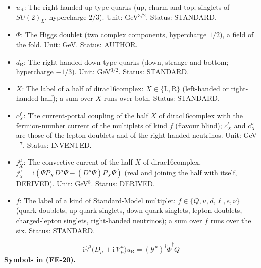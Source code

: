 \documentclass[
  10pt,
]{article}
\begin{document}
\begin{itemize}
  \(\tilde\Phi = \mathrm{i}\tau^2\Phi^*\) (hypercharge \(-1/2\)). Unit:
  GeV. Status: STANDARD.
\item
  \(u_{\mathrm{R}}\): The right-handed up-type quarks (up, charm and
  top; singlets of \(SU(2)_L\), hypercharge \(2/3\)). Unit:
  GeV\(^{3/2}\). Status: STANDARD.
\item
  \(\Phi\): The Higgs doublet (two complex components, hypercharge
  \(1/2\)), a field of the fold. Unit: GeV. Status: AUTHOR.
\item
  \(d_{\mathrm{R}}\): The right-handed down-type quarks (down, strange
  and bottom; hypercharge \(-1/3\)). Unit: GeV\(^{3/2}\). Status:
  STANDARD.
\item
  \(X\): The label of a half of dirac16complex:
  \(X \in \{\mathrm{L}, \mathrm{R}\}\) (left-handed or right-handed
  half); a sum over \(X\) runs over both. Status: STANDARD.
\item
  \(c^{f}_X\): The current-portal coupling of the half \(X\) of
  dirac16complex with the fermion-number current of the multiplets of
  kind \(f\) (flavour blind); \(c^{\ell}_X\) and \(c^{\nu}_X\) are those
  of the lepton doublets and of the right-handed neutrinos. Unit:
  GeV\(^{-7}\). Status: INVENTED.
\item
  \(j_X^\mu\): The convective current of the half \(X\) of
  dirac16complex,
  \(j_X^\mu = \mathrm{i}(\bar\Psi P_XD^\mu\Psi - (D^\mu\bar\Psi)P_X\Psi)\)
  (real and joining the half with itself, DERIVED). Unit: GeV\(^8\).
  Status: DERIVED.
\item
  \(f\): The label of a kind of Standard-Model multiplet:
  \(f \in \{Q, u, d, \ell, e, \nu\}\) (quark doublets, up-quark
  singlets, down-quark singlets, lepton doublets, charged-lepton
  singlets, right-handed neutrinos); a sum over \(f\) runs over the six.
  Status: STANDARD.
\end{itemize}

\[
\mathrm{i}\hat\gamma^\mu\big(D_\mu + \mathrm{i}\,\mathcal{V}^{u}_\mu\big)u_{\mathrm{R}} = (\mathcal{Y}^{u})^\dagger\tilde\Phi^\dagger Q \tag{FE-20}
\] \textbf{Symbols in (FE-20).}
\end{document}
